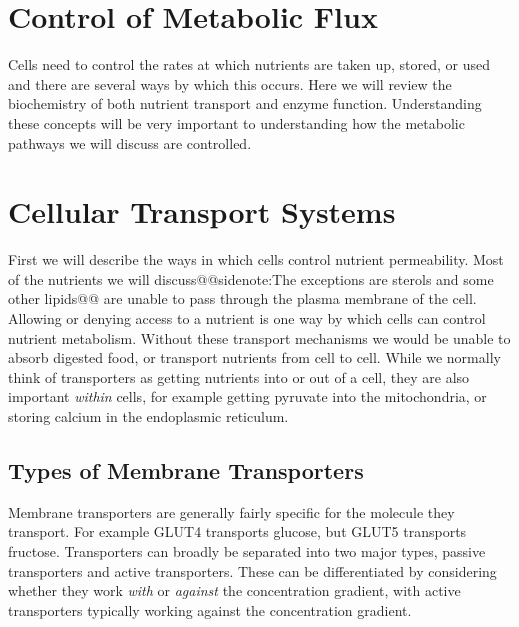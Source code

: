 \documentclass{tufte-handout}
\makeatletter
\def\sidenote#1{@@sidenote:#1@@}
\makeatother
\begin{document}
\section{Control of Metabolic Flux}

Cells need to control the rates at which nutrients are taken up, stored, or used and there are several ways by which this occurs.  Here we will review the biochemistry of both nutrient transport and enzyme function.  Understanding these concepts will be very important to understanding how the metabolic pathways we will discuss are controlled. 

\section{Cellular Transport Systems}

First we will describe the ways in which cells control nutrient permeability.  Most of the nutrients we will discuss\sidenote{The exceptions are sterols and some other lipids} are unable to pass through the plasma membrane of the cell.  Allowing or denying access to a nutrient is one way by which cells can control nutrient metabolism.  Without these transport mechanisms we would be unable to absorb digested food, or transport nutrients from cell to cell.  While we normally think of transporters as getting nutrients into or out of a cell, they are also important \emph{within} cells, for example getting pyruvate into the mitochondria, or storing calcium in the endoplasmic reticulum.

\subsection{Types of Membrane Transporters}

Membrane transporters are generally fairly specific for the molecule they transport.  For example GLUT4 transports glucose, but GLUT5 transports fructose.  Transporters can broadly be separated into two major types, passive transporters and active transporters.  These can be differentiated by considering whether they work \emph{with} or \emph{against} the concentration gradient, with active transporters typically working against the concentration gradient.
\end{document}
